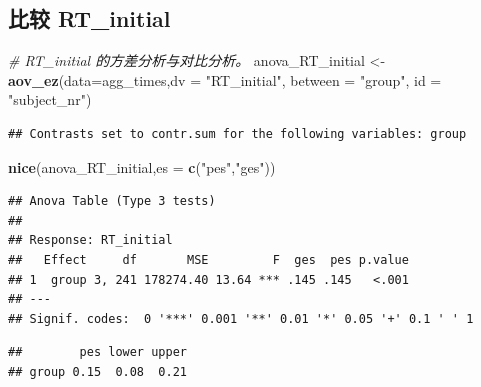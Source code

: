 \documentclass[
]{article}
\newenvironment{Shaded}{\begin{snugshade}}{\end{snugshade}}
\newcommand{\AttributeTok}[1]{\textcolor[rgb]{0.13,0.29,0.53}{#1}}
\newcommand{\CommentTok}[1]{\textcolor[rgb]{0.56,0.35,0.01}{\textit{#1}}}
\newcommand{\DecValTok}[1]{\textcolor[rgb]{0.00,0.00,0.81}{#1}}
\newcommand{\FunctionTok}[1]{\textcolor[rgb]{0.13,0.29,0.53}{\textbf{#1}}}
\newcommand{\NormalTok}[1]{#1}
\newcommand{\OtherTok}[1]{\textcolor[rgb]{0.56,0.35,0.01}{#1}}
\newcommand{\SpecialCharTok}[1]{\textcolor[rgb]{0.81,0.36,0.00}{\textbf{#1}}}
\newcommand{\StringTok}[1]{\textcolor[rgb]{0.31,0.60,0.02}{#1}}
\begin{document}
\subsection{比较 RT\_initial}\label{ux6bd4ux8f83-rt_initial}

\begin{Shaded}
\begin{Highlighting}[]
\CommentTok{\# RT\_initial 的方差分析与对比分析。}
\NormalTok{anova\_RT\_initial }\OtherTok{\textless{}{-}} \FunctionTok{aov\_ez}\NormalTok{(}\AttributeTok{data=}\NormalTok{agg\_times,}\AttributeTok{dv =} \StringTok{"RT\_initial"}\NormalTok{, }\AttributeTok{between =} \StringTok{"group"}\NormalTok{, }\AttributeTok{id =} \StringTok{"subject\_nr"}\NormalTok{)}
\end{Highlighting}
\end{Shaded}

\begin{verbatim}
## Contrasts set to contr.sum for the following variables: group
\end{verbatim}

\begin{Shaded}
\begin{Highlighting}[]
\FunctionTok{nice}\NormalTok{(anova\_RT\_initial,}\AttributeTok{es =} \FunctionTok{c}\NormalTok{(}\StringTok{"pes"}\NormalTok{,}\StringTok{"ges"}\NormalTok{))}
\end{Highlighting}
\end{Shaded}

\begin{verbatim}
## Anova Table (Type 3 tests)
## 
## Response: RT_initial
##   Effect     df       MSE         F  ges  pes p.value
## 1  group 3, 241 178274.40 13.64 *** .145 .145   <.001
## ---
## Signif. codes:  0 '***' 0.001 '**' 0.01 '*' 0.05 '+' 0.1 ' ' 1
\end{verbatim}

\begin{Shaded}
\end{Shaded}

\begin{verbatim}
##        pes lower upper
## group 0.15  0.08  0.21
\end{verbatim}
\end{document}
